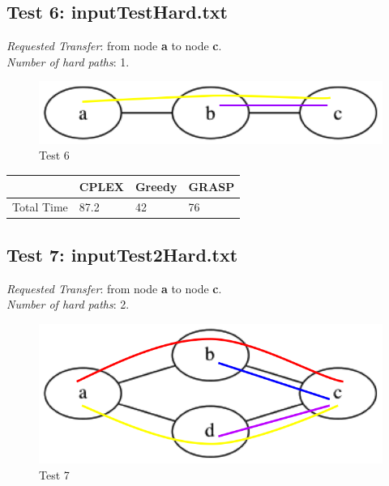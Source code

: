 \documentclass[11pt,a4paper]{article}
\begin{document}
\subsection{Test 6: inputTestHard.txt}

\textit{Requested Transfer}: from node \textbf{a} to node \textbf{c}.\\
\textit{Number of hard paths}: 1.\\

\begin{figure}[H]
  \centering
    \includegraphics[scale=0.7]{inputTestHard.png}
  \caption{Test 6}
  \label{fig:test6}
\end{figure}

\begin{tabular}{| l | l | l | l |}
\hline
 & CPLEX & Greedy & GRASP \\ \hline
Total Time & 87.2 & 42 & 76 \\ \hline
\end{tabular}

\subsection{Test 7: inputTest2Hard.txt}

\textit{Requested Transfer}: from node \textbf{a} to node \textbf{c}.\\
\textit{Number of hard paths}: 2.\\

\begin{figure}[H]
  \centering
    \includegraphics[scale=0.7]{inputTest2Hard.png}
  \caption{Test 7}
  \label{fig:test7}
\end{figure}
\end{document}
